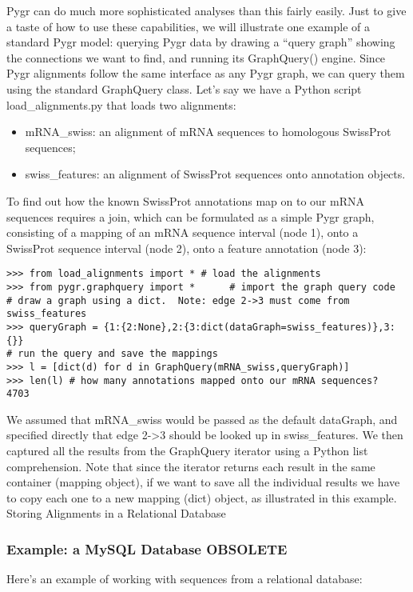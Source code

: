 \documentclass{howto}
\begin{document}
Pygr can do much more sophisticated analyses than this fairly easily.  
Just to give a taste of how to use these capabilities, we will illustrate
one example of a standard Pygr model: querying Pygr data by drawing a ``query
graph'' showing the connections we want to find, and running its GraphQuery()
engine.  Since Pygr alignments follow the same interface as any Pygr graph, we can query them using the standard GraphQuery class.  Let's say we have a Python script load_alignments.py that loads two alignments:

\begin{itemize}

\item
mRNA_swiss: an alignment of mRNA sequences to homologous SwissProt sequences;

\item
swiss_features: an alignment of SwissProt sequences onto annotation objects. 

\end{itemize}
To find out how the known SwissProt annotations map on to our mRNA sequences requires a join, which can be formulated as a simple Pygr graph, consisting of a mapping of an mRNA sequence interval (node 1), onto a SwissProt sequence interval (node 2), onto a feature annotation (node 3):

\begin{verbatim}
>>> from load_alignments import * # load the alignments
>>> from pygr.graphquery import *      # import the graph query code
# draw a graph using a dict.  Note: edge 2->3 must come from swiss_features
>>> queryGraph = {1:{2:None},2:{3:dict(dataGraph=swiss_features)},3:{}} 
# run the query and save the mappings
>>> l = [dict(d) for d in GraphQuery(mRNA_swiss,queryGraph)] 
>>> len(l) # how many annotations mapped onto our mRNA sequences?
4703
\end{verbatim}

We assumed that mRNA_swiss would be passed as the default dataGraph, and specified directly that edge 2->3 should be looked up in swiss_features.  We then captured all the results from the GraphQuery iterator using a Python list comprehension.  Note that since the iterator returns each result in the same container (mapping object), if we want to save all the individual results we have to copy each one to a new mapping (dict) object, as illustrated in this example.
Storing Alignments in a Relational Database


\subsubsection{Example: a MySQL Database OBSOLETE}
Here's an example of working with sequences from a relational database:
\end{document}
